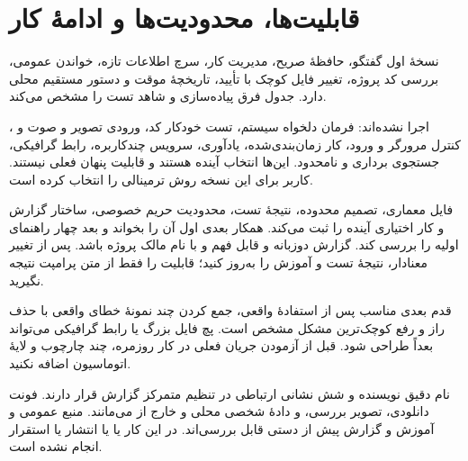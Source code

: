 \chapter{قابلیت‌ها، محدودیت‌ها و ادامهٔ کار}

نسخهٔ اول گفتگو، حافظهٔ صریح، مدیریت کار، سرچ اطلاعات تازه، خواندن 
 عمومی، بررسی کد پروژه، تغییر فایل کوچک با تأیید، تاریخچهٔ موقت و دستور مستقیم محلی دارد. جدول 
 فرق پیاده‌سازی و شاهد تست را مشخص می‌کند.

اجرا نشده‌اند: فرمان دلخواه سیستم، تست خودکار کد، ورودی تصویر و صوت و 
، کنترل مرورگر و ورود، کار زمان‌بندی‌شده، یادآوری، سرویس چندکاربره، رابط گرافیکی، جستجوی برداری و 
 نامحدود. این‌ها انتخاب آینده هستند و قابلیت پنهان فعلی نیستند. کاربر برای این نسخه روش ترمینالی را انتخاب کرده است.

فایل 
 معماری، تصمیم محدوده، نتیجهٔ تست، محدودیت حریم خصوصی، ساختار گزارش و کار اختیاری آینده را ثبت می‌کند. همکار بعدی اول آن را بخواند و بعد چهار راهنمای اولیه را بررسی کند. گزارش دوزبانه و قابل فهم و با نام مالک پروژه باشد. پس از تغییر معنادار، نتیجهٔ تست و آموزش را به‌روز کنید؛ قابلیت را فقط از متن پرامپت نتیجه نگیرید.

قدم بعدی مناسب پس از استفادهٔ واقعی، جمع کردن چند نمونهٔ خطای واقعی با حذف راز و رفع کوچک‌ترین مشکل مشخص است. پچ فایل بزرگ یا رابط گرافیکی می‌تواند بعداً طراحی شود. قبل از آزمودن جریان فعلی در کار روزمره، چند چارچوب و لایهٔ اتوماسیون اضافه نکنید.

نام دقیق نویسنده و شش نشانی ارتباطی در تنظیم متمرکز گزارش قرار دارند. فونت دانلودی، تصویر بررسی، 
 و دادهٔ شخصی محلی و خارج از 
 می‌مانند. منبع عمومی و آموزش و گزارش پیش از 
 دستی قابل بررسی‌اند. در این کار 
 یا 
 یا انتشار یا استقرار انجام نشده است.
